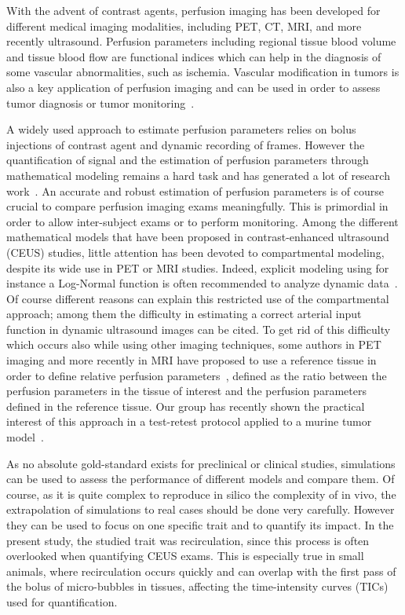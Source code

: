 With the advent of contrast agents, perfusion imaging has been developed for different medical imaging modalities, including PET, CT, MRI, and more recently ultrasound. Perfusion parameters including regional tissue blood volume and tissue blood flow are functional indices which can help in the  diagnosis of some vascular abnormalities, such as ischemia. Vascular modification in tumors is also a key application of perfusion imaging and can be used in order to assess tumor diagnosis or tumor monitoring~\cite{Dietrich:2012kw}. 

A widely used approach to estimate perfusion parameters relies on bolus injections of contrast agent and dynamic recording of frames. However the quantification of signal and the estimation of perfusion parameters through mathematical modeling remains a hard task and has generated a lot of research work~\cite{Turco:2016}. An accurate and robust estimation of perfusion parameters is of course crucial to compare perfusion imaging exams meaningfully. This is primordial in order to allow inter-subject exams or to perform monitoring. 
Among the different mathematical models that have been proposed in contrast-enhanced ultrasound (CEUS) studies, little attention has been devoted to compartmental modeling, despite its wide use in PET or MRI studies. Indeed, explicit modeling using for instance a Log-Normal function is often recommended to analyze dynamic data~\cite{Strouthos2010it,Dietrich:2012kw}.
Of course different reasons can explain this restricted use of the compartmental approach; among them the difficulty in estimating a correct arterial input function in dynamic ultrasound images can be cited. To get rid of this difficulty which occurs also while using other imaging techniques, some authors in PET imaging and more recently in MRI have proposed to use a reference tissue in order to define relative perfusion parameters~\cite{Yankeelov2005de,CardenasRodriguez:2013em}, defined as the ratio between the perfusion parameters in the tissue of interest and the perfusion parameters defined in the reference tissue. Our group has recently shown the practical interest of this approach in a test-retest protocol applied to a murine tumor model~\cite{Doury:2016fi,Doury:2017fz}. 

As no absolute gold-standard exists for preclinical or clinical studies, simulations can be used to assess the performance of different models and compare them. Of course, as it is quite complex to reproduce in silico the complexity of in vivo, the extrapolation of simulations to real cases should be done very carefully. However they can be used to focus on one specific trait and to quantify its impact. In the present study, the studied trait was recirculation, since this process is often overlooked when quantifying CEUS exams. This is especially true in small animals, where recirculation occurs quickly and can overlap with the first pass of the bolus of micro-bubbles in tissues, affecting the time-intensity curves (TICs) used for quantification.

